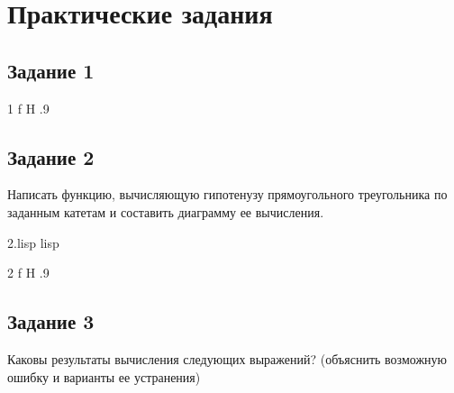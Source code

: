 \chapter{Практические задания}

\section{Задание 1}
{1}
{f}
{H}
{.9\textwidth}
{}

\clearpage

\section{Задание 2}
Написать функцию, вычисляющую гипотенузу прямоугольного треугольника по заданным катетам и составить диаграмму ее вычисления.

{2.lisp}
{lisp}
{}

{2}
{f}
{H}
{.9\textwidth}
{}

\clearpage

\section{Задание 3}
Каковы результаты вычисления следующих выражений? (объяснить возможную ошибку и варианты ее устранения)

